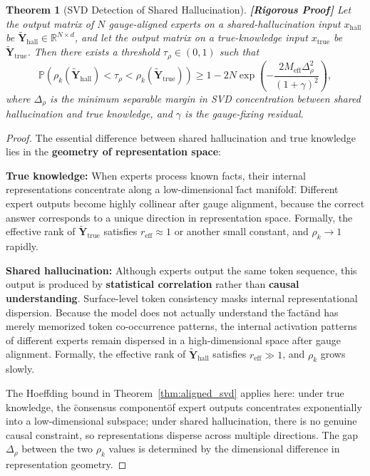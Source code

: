 \documentclass[12pt,a4paper]{article}
\newtheorem{theorem}{Theorem}[section]
\theoremstyle{remark}
\newcommand{\R}{\mathbb{R}}
\newcommand{\Pbb}{\mathbb{P}}
\newcommand{\rigorFull}{\textnormal{\textbf{[Rigorous Proof]}}}
\begin{document}
\begin{theorem}[SVD Detection of Shared Hallucination]\label{thm:svd_shared_hall}\rigorFull
Let the output matrix of $N$ gauge-aligned experts on a shared-hallucination input $x_{\text{hall}}$ be $\tilde{\mathbf{Y}}_{\text{hall}} \in \R^{N \times d}$, and let the output matrix on a true-knowledge input $x_{\text{true}}$ be $\tilde{\mathbf{Y}}_{\text{true}}$. Then there exists a threshold $\tau_\rho \in (0, 1)$ such that
\begin{equation}
    \Pbb\left(\rho_k(\tilde{\mathbf{Y}}_{\text{hall}}) < \tau_\rho < \rho_k(\tilde{\mathbf{Y}}_{\text{true}})\right) \geq 1 - 2N\exp\left(-\frac{2 M_{\text{eff}} \Delta_\rho^2}{(1 + \gamma)^2}\right),
\end{equation}
where $\Delta_\rho$ is the minimum separable margin in SVD concentration between shared hallucination and true knowledge, and $\gamma$ is the gauge-fixing residual.
\end{theorem}

\begin{proof}
The essential difference between shared hallucination and true knowledge lies in the \textbf{geometry of representation space}:

\textbf{True knowledge:} When experts process known facts, their internal representations concentrate along a low-dimensional \"fact manifold\". Different expert outputs become highly collinear after gauge alignment, because the correct answer corresponds to a unique direction in representation space. Formally, the effective rank of $\tilde{\mathbf{Y}}_{\text{true}}$ satisfies $r_{\text{eff}} \approx 1$ or another small constant, and $\rho_k \to 1$ rapidly.

\textbf{Shared hallucination:} Although experts output the same token sequence, this output is produced by \textbf{statistical correlation} rather than \textbf{causal understanding}. Surface-level token consistency masks internal representational dispersion. Because the model does not actually understand the \"fact\" and has merely memorized token co-occurrence patterns, the internal activation patterns of different experts remain dispersed in a high-dimensional space after gauge alignment. Formally, the effective rank of $\tilde{\mathbf{Y}}_{\text{hall}}$ satisfies $r_{\text{eff}} \gg 1$, and $\rho_k$ grows slowly.

The Hoeffding bound in Theorem~\ref{thm:aligned_svd} applies here: under true knowledge, the \"consensus component\" of expert outputs concentrates exponentially into a low-dimensional subspace; under shared hallucination, there is no genuine causal constraint, so representations disperse across multiple directions. The gap $\Delta_\rho$ between the two $\rho_k$ values is determined by the dimensional difference in representation geometry.
\end{proof}
\end{document}
